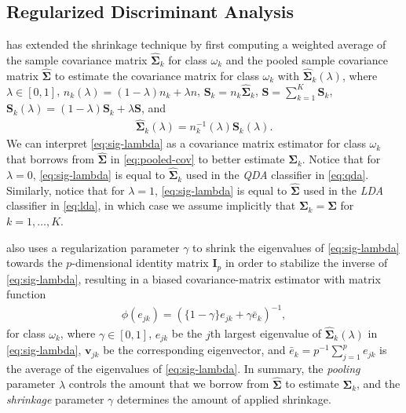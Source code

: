 \documentclass[11pt]{article}
\begin{document}
\subsection{Regularized Discriminant Analysis}

\cite{Friedman:1989tm} has extended the shrinkage technique by first computing a
weighted average of the sample covariance matrix $\widehat{\bm \Sigma}_k$ for class
$\omega_k$ and the pooled sample covariance matrix $\widehat{\bm\Sigma}$ to
estimate the covariance matrix for class $\omega_k$ with $\widehat{\bm\Sigma}_k(\lambda)$,
where $\lambda \in [0, 1]$, $n_k(\lambda) = (1 - \lambda) n_k + \lambda n$, $\bm S_k = n_k \widehat{\bm\Sigma}_k$, $\bm S = \sum_{k=1}^K \bm S_k$, $\bm S_k(\lambda) = (1 - \lambda) \bm S_k + \lambda \bm S$, and
\begin{align}
  \widehat{\bm\Sigma}_k(\lambda) = n_k^{-1}(\lambda) \bm S_k(\lambda).\label{eq:sig-lambda}
\end{align}
We can interpret \eqref{eq:sig-lambda} as a
covariance matrix estimator for class $\omega_k$ that borrows from $\widehat{\bm\Sigma}$ in \eqref{eq:pooled-cov} to better estimate $\bm \Sigma_k$. Notice that for $\lambda = 0$,
\eqref{eq:sig-lambda} is equal to $\widehat{\bm\Sigma}_k$ used in the \emph{QDA} classifier in \eqref{eq:qda}. Similarly, notice that for $\lambda = 1$, \eqref{eq:sig-lambda} is equal to $\widehat{\bm\Sigma}$ used in the \emph{LDA} classifier in \eqref{eq:lda}, in which case we assume implicitly that $\bm\Sigma_k = \bm \Sigma$ for $k = 1, \ldots, K$.

\cite{Friedman:1989tm} also uses a regularization parameter $\gamma$ to shrink the
eigenvalues of \eqref{eq:sig-lambda} towards the $p$-dimensional identity matrix $\bm I_p$
in order to stabilize the inverse of \eqref{eq:sig-lambda}, resulting in a biased
covariance-matrix estimator with matrix function
\begin{align}
	\phi(e_{jk}) = (\{1 - \gamma\} e_{jk} + \gamma \bar{e}_k)^{-1},\label{eq:rda-eigenvalue-function}
\end{align}
for class $\omega_k$, where $\gamma \in [0, 1]$, $e_{jk}$ be the $j$th largest eigenvalue of $\widehat{\bm\Sigma}_k(\lambda)$ in \eqref{eq:sig-lambda}, $\bm v_{jk}$ be the corresponding eigenvector, and $\bar{e}_k = p^{-1} \sum_{j=1}^p e_{jk}$ is the average of the eigenvalues of \eqref{eq:sig-lambda}. In summary, the \emph{pooling} parameter $\lambda$ controls the amount that we borrow from $\widehat{\bm\Sigma}$ to estimate $\bm \Sigma_k$, and the \emph{shrinkage} parameter $\gamma$ determines the amount of applied shrinkage.
\end{document}
